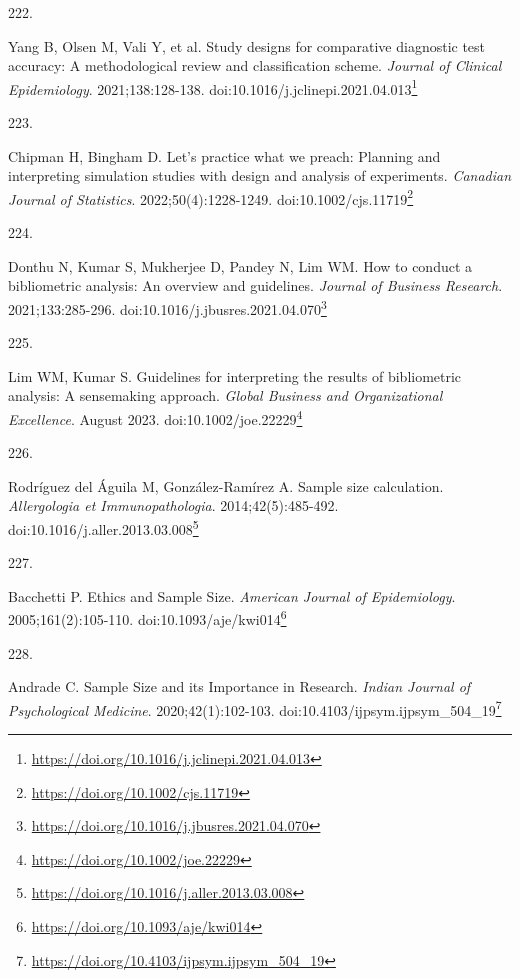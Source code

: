 \documentclass[
  a4paper,
]{book}
\newlength{\cslhangindent}
\newlength{\csllabelwidth}
\newlength{\cslentryspacingunit} %
\newenvironment{CSLReferences}[2] %
 {%
  \setlength{\parindent}{0pt}
  \ifodd #1
  \let\oldpar\par
  \def\par{\hangindent=\cslhangindent\oldpar}
  \fi
  \setlength{\parskip}{#2\cslentryspacingunit}
 }%
 {}
\newcommand{\CSLLeftMargin}[1]{\parbox[t]{\csllabelwidth}{#1}}
\newcommand{\CSLRightInline}[1]{\parbox[t]{\linewidth - \csllabelwidth}{#1}\break}
\renewcommand{\href}[2]{#2\footnote{\url{#1}}}
\begin{document}
\begin{CSLReferences}{0}{0}
\leavevmode{}%
\CSLLeftMargin{222. }%
\CSLRightInline{Yang B, Olsen M, Vali Y, et al. Study designs for comparative diagnostic test accuracy: A methodological review and classification scheme. \emph{Journal of Clinical Epidemiology}. 2021;138:128-138. doi:\href{https://doi.org/10.1016/j.jclinepi.2021.04.013}{10.1016/j.jclinepi.2021.04.013}}

\leavevmode{}%
\CSLLeftMargin{223. }%
\CSLRightInline{Chipman H, Bingham D. Let's practice what we preach: Planning and interpreting simulation studies with design and analysis of experiments. \emph{Canadian Journal of Statistics}. 2022;50(4):1228-1249. doi:\href{https://doi.org/10.1002/cjs.11719}{10.1002/cjs.11719}}

\leavevmode{}%
\CSLLeftMargin{224. }%
\CSLRightInline{Donthu N, Kumar S, Mukherjee D, Pandey N, Lim WM. How to conduct a bibliometric analysis: An overview and guidelines. \emph{Journal of Business Research}. 2021;133:285-296. doi:\href{https://doi.org/10.1016/j.jbusres.2021.04.070}{10.1016/j.jbusres.2021.04.070}}

\leavevmode{}%
\CSLLeftMargin{225. }%
\CSLRightInline{Lim WM, Kumar S. Guidelines for interpreting the results of bibliometric analysis: A sensemaking approach. \emph{Global Business and Organizational Excellence}. August 2023. doi:\href{https://doi.org/10.1002/joe.22229}{10.1002/joe.22229}}

\leavevmode{}%
\CSLLeftMargin{226. }%
\CSLRightInline{Rodríguez del Águila M, González-Ramírez A. Sample size calculation. \emph{Allergologia et Immunopathologia}. 2014;42(5):485-492. doi:\href{https://doi.org/10.1016/j.aller.2013.03.008}{10.1016/j.aller.2013.03.008}}

\leavevmode{}%
\CSLLeftMargin{227. }%
\CSLRightInline{Bacchetti P. Ethics and Sample Size. \emph{American Journal of Epidemiology}. 2005;161(2):105-110. doi:\href{https://doi.org/10.1093/aje/kwi014}{10.1093/aje/kwi014}}

\leavevmode{}%
\CSLLeftMargin{228. }%
\CSLRightInline{Andrade C. Sample Size and its Importance in Research. \emph{Indian Journal of Psychological Medicine}. 2020;42(1):102-103. doi:\href{https://doi.org/10.4103/ijpsym.ijpsym_504_19}{10.4103/ijpsym.ijpsym\_504\_19}}


\end{CSLReferences}
\end{document}
